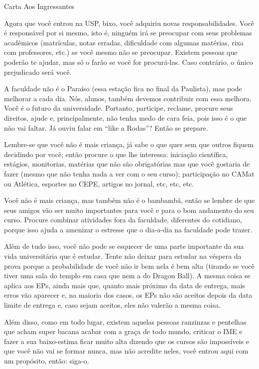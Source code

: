 \begin{secao}{Carta Aos Ingressantes}

Agora que você entrou na USP, bixo, você adquiriu novas responsabilidades.
Você é responsável por si mesmo, isto é, ninguém irá se preocupar com seus
problemas acadêmicos (matrículas, notas erradas, dificuldade com algumas
matérias, rixa com professores, etc.) se você mesmo não se preocupar. Existem
pessoas que poderão te ajudar, mas só o farão se você for procurá-las. Caso
contrário, o único prejudicado será você.

A faculdade não é o Paraíso (essa estação fica no final da Paulista), mas pode
melhorar a cada dia. Nós, alunos, também devemos contribuir com essa melhora.
Você é o futuro da universidade. Portanto, participe, reclame, procure seus
direitos, ajude e, principalmente, não tenha medo de cara feia, pois isso é o
que não vai faltar. Já ouviu falar em “like a Rodas”? Então se prepare.

Lembre-se que você não é mais criança, já sabe o que quer sem que outros fiquem
decidindo por você; então procure o que lhe interessa: iniciação científica,
estágios, monitorias, matérias que não são obrigatórias mas que você gostaria
de fazer (mesmo que não tenha nada a ver com o seu curso); participação no
CAMat ou Atlética, esportes no CEPE, artigos no jornal, etc, etc, etc.

Você não é mais criança, mas também não é o bambambã, então se lembre de que
seus amigos vão ser muito importantes para você e para o bom andamento do seu
curso. Procure combinar atividades fora da faculdade, diferentes do cotidiano,
porque isso ajuda a amenizar o estresse que o dia-a-dia na faculdade pode trazer.

Além de tudo isso, você não pode se esquecer de uma parte importante da sua vida
universitária que é estudar. Tente não deixar para estudar na véspera da prova
porque a probabilidade de você não ir bem nela é bem alta (tirando se você tiver
uma sala do templo em casa que nem a do Dragon Ball). A mesma coisa se aplica aos EPs,
ainda mais que, quanto mais próximo da data de entrega, mais erros vão aparecer
e, na maioria dos casos, os EPs não são aceitos depois da data limite de entrega
e, caso sejam aceitos, eles não valerão a mesma coisa.

Além disso, como em todo lugar, existem aquelas pessoas ranzinzas e pentelhas
que acham super bacana acabar com a graça de todo mundo, criticar o IME e fazer
a sua baixo-estima ficar muito alta dizendo que os cursos são impossíveis e que
você não vai se formar nunca, mas não acredite neles, você entrou aqui com um
propósito, então: siga-o.


\end{secao}
